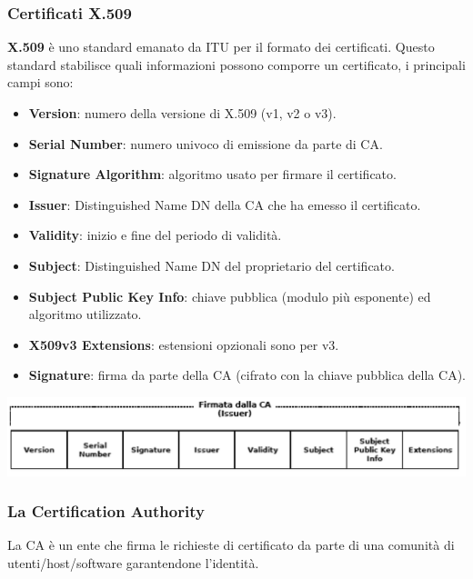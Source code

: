         \subsubsection{Certificati X.509}
            \textbf{X.509} è uno standard emanato da ITU per il formato dei certificati. Questo standard stabilisce quali informazioni possono comporre un certificato, i principali campi sono:
            \begin{itemize}
                \item \textbf{Version}: numero della versione di X.509 (v1, v2 o v3).
                \item \textbf{Serial Number}: numero univoco di emissione da parte di CA.
                \item \textbf{Signature Algorithm}: algoritmo usato per firmare il certificato.
                \item \textbf{Issuer}: Distinguished Name DN della CA che ha emesso il certificato.
                \item \textbf{Validity}: inizio e fine del periodo di validità.
                \item \textbf{Subject}: Distinguished Name DN del proprietario del certificato.
                \item \textbf{Subject Public Key Info}: chiave pubblica (modulo più esponente) ed algoritmo utilizzato.
                \item \textbf{X509v3 Extensions}: estensioni opzionali sono per v3.
                \item \textbf{Signature}: firma da parte della CA (cifrato con la chiave pubblica della
                CA).
            \end{itemize}

            \begin{center}
                \includegraphics[scale=0.333]{chapters/7/assets/schema_w.png}
            \end{center}

        \subsubsection{La Certification Authority}
            La CA è un ente che firma le richieste di certificato da parte di una comunità di utenti/host/software garantendone l'identità.
        
